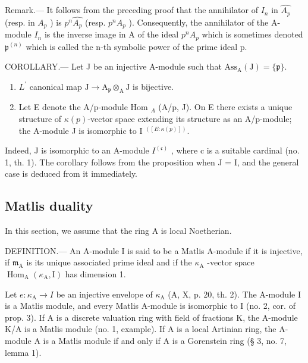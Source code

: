 Remark.--- It follows from the preceding proof that the annihilator of \(I_{n}\) in \(\widehat{A_{p}}\) (resp. in \(A_{p}\) ) is \(p^{n}\widehat{A_{p}}\) (resp. \(p^{n}A_{p}\) ). Consequently, the annihilator of the A-module \(I_{n}\) is the inverse image in A of the ideal \(p^{n}A_{p}\) which is sometimes denoted \(\mathfrak{p}^{(n)}\) which is called the n-th symbolic power of the prime ideal p.

COROLLARY.--- Let J be an injective A-module such that \(\mathrm{Ass}_{\mathrm{A}}(\mathrm{J}) = \{\mathfrak{p}\}\).

\begin{enumerate}
\def\labelenumi{\alph{enumi})}
\item
  \(L^{\prime}\) canonical map \(\mathrm{J} \to \mathrm{A}_{\mathfrak{p}} \otimes_{\mathrm{A}} \mathrm{J}\) is bijective.
\item
  Let E denote the A/p-module Hom \(_A\) (A/p, J). On E there exists a unique structure of \(\kappa(p)\)-vector space extending its structure as an A/p-module; the A-module J is isomorphic to I \(^{([E:\kappa(p)])}\).
\end{enumerate}

Indeed, J is isomorphic to an A-module \(I^{(\mathfrak{c})}\) , where c is a suitable cardinal (no. 1, th. 1). The corollary follows from the proposition when J = I, and the general case is deduced from it immediately.

\subsection{Matlis duality}

In this section, we assume that the ring A is local Noetherian.

DEFINITION.--- An A-module I is said to be a Matlis A-module if it is injective, if \(\mathfrak{m}_{\mathrm{A}}\) is its unique associated prime ideal and if the \(\kappa_{\mathrm{A}}\) -vector space \(\operatorname{Hom}_{\mathrm{A}}(\kappa_{\mathrm{A}}, \mathrm{I})\) has dimension 1.

Let \(e: \kappa_{\mathrm{A}} \to I\) be an injective envelope of \(\kappa_{\mathrm{A}}\) (A, X, p. 20, th. 2). The A-module I is a Matlis module, and every Matlis A-module is isomorphic to I (no. 2, cor. of prop. 3). If A is a discrete valuation ring with field of fractions K, the A-module K/A is a Matlis module (no. 1, example). If A is a local Artinian ring, the A-module A is a Matlis module if and only if A is a Gorenstein ring (§ 3, no. 7, lemma 1).

